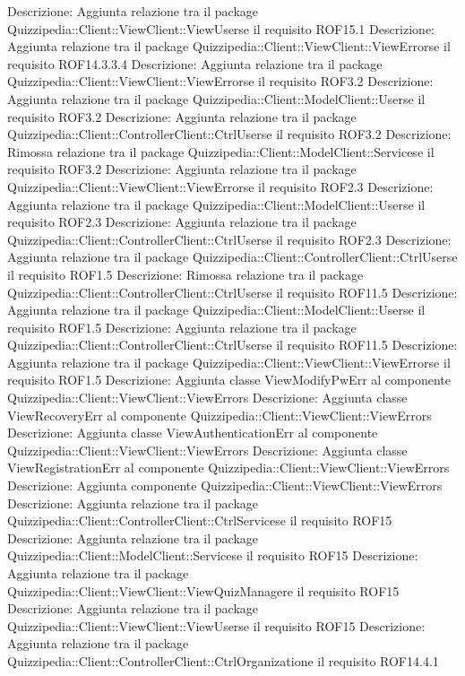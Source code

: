 Descrizione: Aggiunta relazione tra il package Quizzipedia::Client::ViewClient::ViewUserse il requisito ROF15.1 
Descrizione: Aggiunta relazione tra il package Quizzipedia::Client::ViewClient::ViewErrorse il requisito ROF14.3.3.4 
Descrizione: Aggiunta relazione tra il package Quizzipedia::Client::ViewClient::ViewErrorse il requisito ROF3.2 
Descrizione: Aggiunta relazione tra il package Quizzipedia::Client::ModelClient::Userse il requisito ROF3.2 
Descrizione: Aggiunta relazione tra il package Quizzipedia::Client::ControllerClient::CtrlUserse il requisito ROF3.2 
Descrizione: Rimossa relazione tra il package Quizzipedia::Client::ModelClient::Servicese il requisito ROF3.2 
Descrizione: Aggiunta relazione tra il package Quizzipedia::Client::ViewClient::ViewErrorse il requisito ROF2.3 
Descrizione: Aggiunta relazione tra il package Quizzipedia::Client::ModelClient::Userse il requisito ROF2.3 
Descrizione: Aggiunta relazione tra il package Quizzipedia::Client::ControllerClient::CtrlUserse il requisito ROF2.3 
Descrizione: Aggiunta relazione tra il package Quizzipedia::Client::ControllerClient::CtrlUserse il requisito ROF1.5 
Descrizione: Rimossa relazione tra il package Quizzipedia::Client::ControllerClient::CtrlUserse il requisito ROF11.5 
Descrizione: Aggiunta relazione tra il package Quizzipedia::Client::ModelClient::Userse il requisito ROF1.5 
Descrizione: Aggiunta relazione tra il package Quizzipedia::Client::ControllerClient::CtrlUserse il requisito ROF11.5 
Descrizione: Aggiunta relazione tra il package Quizzipedia::Client::ViewClient::ViewErrorse il requisito ROF1.5 
Descrizione: Aggiunta classe ViewModifyPwErr al componente Quizzipedia::Client::ViewClient::ViewErrors 
Descrizione: Aggiunta classe ViewRecoveryErr al componente Quizzipedia::Client::ViewClient::ViewErrors 
Descrizione: Aggiunta classe ViewAuthenticationErr al componente Quizzipedia::Client::ViewClient::ViewErrors 
Descrizione: Aggiunta classe ViewRegistrationErr al componente Quizzipedia::Client::ViewClient::ViewErrors 
Descrizione: Aggiunta componente Quizzipedia::Client::ViewClient::ViewErrors 
Descrizione: Aggiunta relazione tra il package Quizzipedia::Client::ControllerClient::CtrlServicese il requisito ROF15 
Descrizione: Aggiunta relazione tra il package Quizzipedia::Client::ModelClient::Servicese il requisito ROF15 
Descrizione: Aggiunta relazione tra il package Quizzipedia::Client::ViewClient::ViewQuizManagere il requisito ROF15 
Descrizione: Aggiunta relazione tra il package Quizzipedia::Client::ViewClient::ViewUserse il requisito ROF15 
Descrizione: Aggiunta relazione tra il package Quizzipedia::Client::ControllerClient::CtrlOrganizatione il requisito ROF14.4.1 
